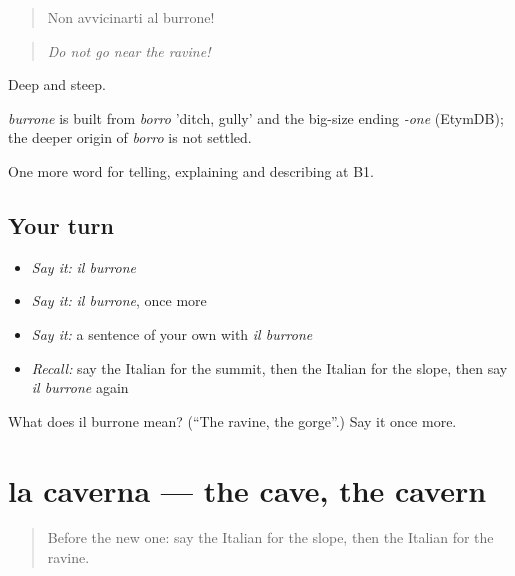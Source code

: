 \begin{quote}
Non avvicinarti al burrone!
\end{quote}

\begin{quote}
\emph{Do not go near the ravine!}
\end{quote}

Deep and steep.

\begin{cousinweb}
\emph{burrone} is built from \emph{borro} 'ditch, gully' and the big-size ending \emph{-one} (EtymDB); the deeper origin of \emph{borro} is not settled.
\end{cousinweb}

\begin{grammarlens}[title={What you've built}]
One more word for telling, explaining and describing at B1.
\end{grammarlens}

\subsection*{Your turn}
\begin{itemize}
\raggedright
  \item \emph{Say it:} \emph{il burrone}
  \item \emph{Say it:} \emph{il burrone}, once more
  \item \emph{Say it:} a sentence of your own with \emph{il burrone}
  \item \emph{Recall:} say the Italian for the summit, then the Italian for the slope, then say \emph{il burrone} again
\end{itemize}

\begin{tcolorbox}[breakable,colback=teal!4,colframe=teal!35!black,title={Before you move on}]
What does il burrone mean? (\textquotedblleft{}The ravine, the gorge\textquotedblright{}.) Say it once more.
\end{tcolorbox}
\section[la caverna]{la caverna — the cave, the cavern}

\label{lesson:IT-C462-caverna}



\begin{quote}
Before the new one: say the Italian for the slope, then the Italian for the ravine.
\end{quote}

